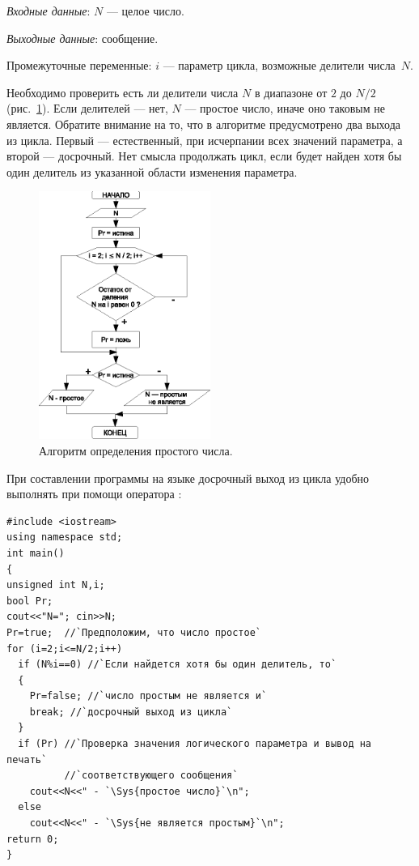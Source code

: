 
\emph{Входные данные}: $N$ --- целое число.

\emph{Выходные данные}: сообщение.

Промежуточные переменные: $i$ --- параметр цикла, возможные делители числа~$N$.

Необходимо проверить есть ли делители числа $N$ в диапазоне от $2$ до $N/2$ (рис.~\ref{ch03:refDrawing31}). Если
делителей --- нет, $N$ --- простое число, иначе оно таковым не является. Обратите внимание на то, что в
алгоритме предусмотрено два выхода из цикла. Первый --- естественный, при исчерпании всех значений параметра, 
а второй --- досрочный. Нет смысла продолжать цикл, если будет найден хотя бы один  делитель из указанной области изменения
параметра.

\begin{figure}[htb]
\begin{center}
\includegraphics[width=0.5\textwidth]{img/ris_3_32}
\caption{Алгоритм определения простого числа.}
\label{ch03:refDrawing31}
\end{center}
\end{figure}

При составлении программы на языке  досрочный выход из цикла удобно выполнять при помощи оператора
:
\begin{lstlisting}
#include <iostream>
using namespace std;
int main()
{
unsigned int N,i;
bool Pr;
cout<<"N="; cin>>N;
Pr=true;  //`Предположим, что число простое`
for (i=2;i<=N/2;i++)
  if (N%i==0) //`Если найдется хотя бы один делитель, то`
  {
    Pr=false; //`число простым не является и`
    break; //`досрочный выход из цикла`
  }
  if (Pr) //`Проверка значения логического параметра и вывод на печать`
          //`соответствующего сообщения`
    cout<<N<<" - `\Sys{простое число}`\n";
  else
    cout<<N<<" - `\Sys{не является простым}`\n";
return 0;
}
\end{lstlisting}

